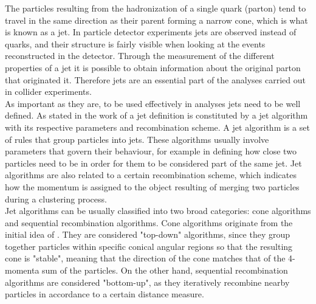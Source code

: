 \documentclass[main]{subfiles} %
\begin{document}
The particles resulting from the hadronization of a single quark (parton) tend to travel in the same direction as their parent forming a narrow cone, which is what is known as a jet. In particle detector experiments jets are observed instead of quarks, and their structure is fairly visible when looking at the events reconstructed in the detector. Through the measurement of the different properties of a jet it is possible to obtain information about the original parton that originated it. Therefore jets are an essential part of the analyses carried out in collider experiments.\\

As important as they are, to be used effectively in analyses jets need to be well defined. As stated in the work of \citet{Salam2010} a jet definition is constituted by a jet algorithm with its respective parameters and recombination scheme. A jet algorithm is a set of rules that group particles into jets. These algorithms usually involve parameters that govern their behaviour, for example in defining how close two particles need to be in order for them to be considered part of the same jet. Jet algorithms are also related to a certain recombination scheme, which indicates how the momentum is assigned to the object resulting of merging two particles during a clustering process.\\

Jet algorithms can be usually classified into two broad categories: cone algorithms and sequential recombination algorithms. Cone algorithms originate from the initial idea of \citet{Sterman1977}. They are considered "top-down" algorithms, since they group together particles within specific conical angular regions so that the resulting cone is "stable", meaning that the direction of the cone matches that of the 4-momenta sum of the particles. On the other hand, sequential recombination algorithms are considered "bottom-up", as they iteratively recombine nearby particles in accordance to a certain distance measure.\\
\end{document}
